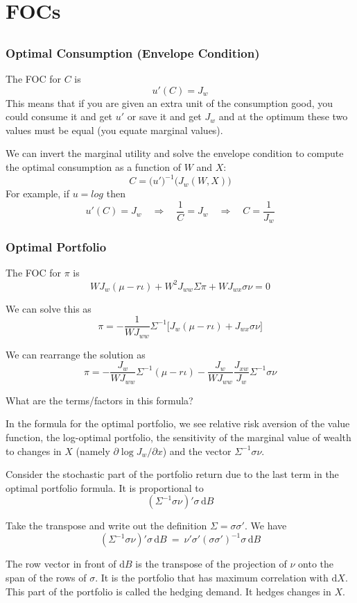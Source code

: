 \documentclass[10pt]{beamer}
\newcommand{\D}{\mathrm{d}}
\newcommand{\bfr}{\begin{frame}}
\begin{document}
\section{FOCs}\subsection{}

\bfr\frametitle{Optimal Consumption (Envelope Condition)}
The FOC for $C$ is 
$$u'(C) = J_w$$
This means that if you are given an extra unit of the consumption good, you could consume it and get $u'$ or save it and get $J_w$ and at the optimum these two values must be equal (you equate marginal values).  

We can invert the marginal utility and solve the envelope condition to compute the optimal consumption as a function of $W$ and $X$:
$$C = \big(u'\big)^{-1}\big(J_w(W,X)\big)$$
For example, if $u=log$ then 
$$u'(C) = J_w \quad \Rightarrow \quad \frac{1}{C} = J_w \quad \Rightarrow \quad C = \frac{1}{J_w}$$
\end{frame}

\bfr\frametitle{Optimal Portfolio}

The FOC for $\pi$ is
$$ WJ_w(\mu-r\iota) + W^2J_{ww}\Sigma\pi + WJ_{wx}\sigma\nu=0$$

We can solve this as 
$$\pi = -\frac{1}{WJ_{ww}}\Sigma^{-1}\bigg[ J_w(\mu-r\iota)+ J_{wx}\sigma\nu\bigg]$$

We can rearrange the solution as
$$\pi = -\frac{J_w}{WJ_{ww}}\Sigma^{-1}(\mu-r\iota)-\frac{J_w}{WJ_{ww}}\frac{J_{xw}}{J_w}\Sigma^{-1} \sigma\nu$$

What are the terms/factors in this formula?
\end{frame}

\begin{frame}[plain]
In the formula for the optimal portfolio, we see relative risk aversion of the value function, the log-optimal portfolio, the sensitivity of the marginal value of wealth to changes in $X$ (namely $\partial \log J_w / \partial x$) and the vector $\Sigma^{-1}\sigma\nu$.

Consider the stochastic part of the portfolio return due to the last term in the optimal portfolio formula.  It is proportional to
$$(\Sigma^{-1}\sigma\nu)'\sigma\,\D B$$

Take the transpose and write out the definition $\Sigma = \sigma\sigma'$.  We have
$$(\Sigma^{-1}\sigma\nu)'\sigma\,\D B \ = \ \nu'\sigma'(\sigma\sigma')^{-1}\sigma\,\D B$$

The row vector in front of $\D B$ is the transpose of the projection of $\nu$ onto the span of the rows of $\sigma$.  It is the portfolio that has maximum correlation with $\D X$.   This part of the portfolio is called the hedging demand.  It hedges changes in $X$.
\end{frame}
\end{document}
